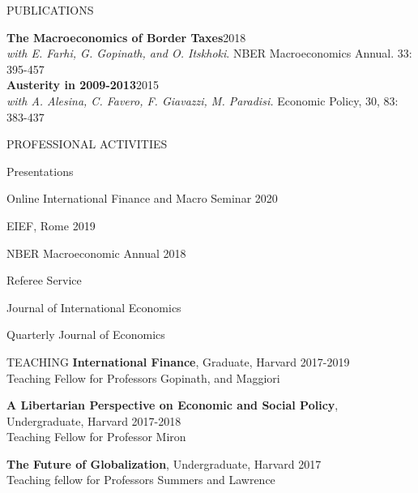 \documentclass{resume} %
\begin{document}
\begin{rSection}{PUBLICATIONS}
	
	{\textbf{The Macroeconomics of Border Taxes}\hfill{2018}}\\\textit{with E. Farhi, G. Gopinath, and O. Itskhoki}. NBER Macroeconomics Annual. 33: 395-457\\

	
	\textbf{Austerity in 2009-2013}\hfill 2015\\
	\textit{with A. Alesina, C. Favero, F. Giavazzi, M. Paradisi.} Economic Policy, 30, 83: 383-437\\

	
\end{rSection} 






\begin{rSection}{PROFESSIONAL ACTIVITIES} 
\begin{rSubsection}{Presentations}{}{}{}
	\item Online International Finance and Macro Seminar \hfill 2020
	\item EIEF, Rome \hfill 2019
	\item NBER Macroeconomic Annual \hfill 2018
\end{rSubsection}

\begin{rSubsection}{Referee Service}{}{}{}
	\item Journal of International Economics
	\item Quarterly Journal of Economics
\end{rSubsection}

\end{rSection} 

\begin{rSection}{TEACHING} 
\textbf{International Finance}, Graduate, Harvard \hfill 2017-2019 \\
Teaching Fellow for Professors Gopinath, and Maggiori

\textbf{A Libertarian Perspective on Economic and Social Policy}, Undergraduate, Harvard \hfill 2017-2018 \\ Teaching Fellow for Professor Miron

\textbf{The Future of Globalization}, Undergraduate, Harvard \hfill 2017 \\
Teaching fellow for Professors Summers and Lawrence
\end{rSection}


\bigskip
\end{document}
